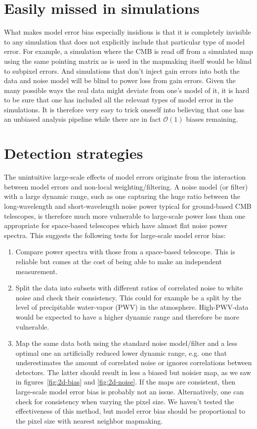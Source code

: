 \documentclass[twocolumn,apj]{aastex63}
\begin{document}
\section{Easily missed in simulations}
What makes model error bias especially insidious is that
it is completely invisible to any simulation that does not explicitly include
that particular type of model error. For example, a simulation where the CMB
is read off from a simulated map using the same pointing matrix as is used
in the mapmaking itself would be blind to subpixel errors. And simulations that
don't inject gain errors into both the data and noise model will be blind to
power loss from gain errors. Given the many
possible ways the real data might deviate from one's model of it, it is hard
to be sure that one has included all the relevant types of model error in the simulations.
It is therefore very easy to trick oneself into believing that one has an
unbiased analysis pipeline while there are in fact $\mathcal{O}(1)$ biases remaining.

\section{Detection strategies}
The unintuitive large-scale effects of model errors originate from the interaction
between model errors and non-local weighting/filtering. A noise model (or filter) with
a large dynamic range, such as one capturing the huge ratio between the long-wavelength
and short-wavelength noise power typical for ground-based CMB telescopes, is therefore
much more vulnerable to large-scale power loss than one appropriate for
space-based telescopes which have almost flat noise power spectra. This suggests
the following tests for large-scale model error bias:
\begin{enumerate}
	\item Compare power spectra with those from a space-based telescope.
		This is reliable but comes at the cost of being able to make an independent measurement.
	\item Split the data into subsets with different ratios of correlated noise to white noise
		and check their consistency. This could for example be a split by the
		level of precipitable water-vapor (PWV) in the atmosphere. High-PWV-data
		would be expected to have a higher dynamic range and therefore be more vulnerable.
	\item Map the same data both using the standard noise model/filter and a
		less optimal one an artificially reduced lower dynamic range, e.g. one that
		underestimates the amount of correlated noise or ignores correlations between
		detectors. The latter should result in less a biased but noisier map, as we saw
		in figures~\ref{fig:2d-bias} and \ref{fig:2d-noise}.
		If the maps are consistent, then large-scale model error bias is probably not an issue.
		Alternatively, one can check for consistency when varying the pixel size. We haven't
		tested the effectiveness of this method, but model error bias should be proportional
		to the pixel size with nearest neighbor mapmaking.
\end{enumerate}
\end{document}
